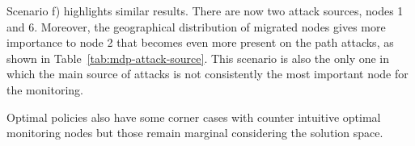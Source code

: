 Scenario f) highlights similar results. There are now two attack sources, nodes 1 and 6. Moreover, the geographical distribution of migrated nodes gives more importance to node 2 that becomes even more present on the path attacks, as shown in Table~\ref{tab:mdp-attack-source}. This scenario is also the only one in which the main source of attacks is not consistently the most important node for the monitoring.

Optimal policies also have some corner cases with counter intuitive optimal monitoring nodes but those remain marginal considering the solution space. 







